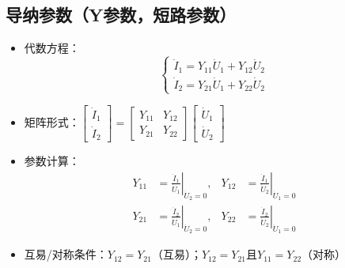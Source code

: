 \subsection{导纳参数（Y参数，短路参数）}
\begin{itemize}
    \item 代数方程：
    \[
    \begin{cases} 
    \dot{I}_1 = Y_{11}\dot{U}_1 + Y_{12}\dot{U}_2 \\ 
    \dot{I}_2 = Y_{21}\dot{U}_1 + Y_{22}\dot{U}_2 
    \end{cases}
    \]
    \item 矩阵形式：$\begin{bmatrix} \dot{I}_1 \\ \dot{I}_2 \end{bmatrix} = \begin{bmatrix} Y_{11} & Y_{12} \\ Y_{21} & Y_{22} \end{bmatrix}\begin{bmatrix} \dot{U}_1 \\ \dot{U}_2 \end{bmatrix}$
    \item 参数计算：
    \[
    \begin{aligned}
    Y_{11} &= \left. \frac{\dot{I}_1}{\dot{U}_1} \right|_{\dot{U}_2 = 0}, & Y_{12} &= \left. \frac{\dot{I}_1}{\dot{U}_2} \right|_{\dot{U}_1 = 0} \\
    Y_{21} &= \left. \frac{\dot{I}_2}{\dot{U}_1} \right|_{\dot{U}_2 = 0}, & Y_{22} &= \left. \frac{\dot{I}_2}{\dot{U}_2} \right|_{\dot{U}_1 = 0}
    \end{aligned}
    \]
    \item 互易/对称条件：$Y_{12}=Y_{21}$（互易）；$Y_{12}=Y_{21}$且$Y_{11}=Y_{22}$（对称）
\end{itemize}

